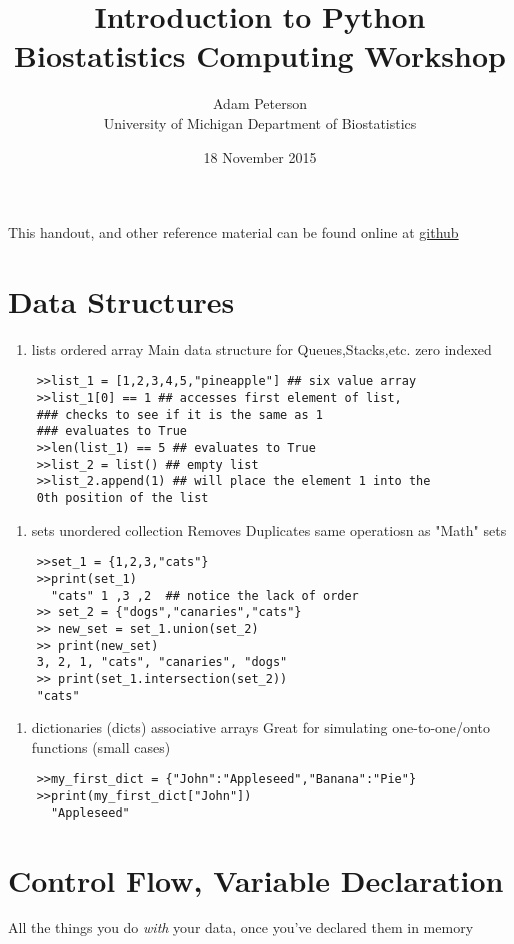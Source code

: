 \documentclass{article}
\title{Introduction to Python\\
	\Large{Biostatistics Computing Workshop}}
\author{Adam Peterson \\ \small{University of Michigan Department of Biostatistics}}
\date{18 November 2015}
\begin{document}
	\lstset{language=Python}
	\maketitle
	
	This handout, and other reference material can be found online at \href{https://github.com/apeterson91/computing_workshops}{github}

	\section{Data Structures}
			\begin{enumerate}
				\item lists
					\subitem ordered array
					\subitem Main data structure for Queues,Stacks,etc.
					\subitem zero indexed
			\end{enumerate}
	\begin{lstlisting}
	>>list_1 = [1,2,3,4,5,"pineapple"] ## six value array
	>>list_1[0] == 1 ## accesses first element of list, 
	### checks to see if it is the same as 1
	### evaluates to True
	>>len(list_1) == 5 ## evaluates to True
	>>list_2 = list() ## empty list
	>>list_2.append(1) ## will place the element 1 into the
	0th position of the list
	\end{lstlisting}
			\begin{enumerate}
				\item sets
					\subitem unordered collection
					\subitem Removes Duplicates
					\subitem same operatiosn as "Math" sets
			\end{enumerate}
	\begin{lstlisting}
	>>set_1 = {1,2,3,"cats"}
	>>print(set_1) 
	  "cats" 1 ,3 ,2  ## notice the lack of order
	>> set_2 = {"dogs","canaries","cats"}
	>> new_set = set_1.union(set_2)
	>> print(new_set)
	3, 2, 1, "cats", "canaries", "dogs"
	>> print(set_1.intersection(set_2))
	"cats"
	\end{lstlisting}
			\begin{enumerate}
				\item dictionaries (dicts)
					\subitem associative arrays
					\subitem Great for simulating one-to-one/onto functions (small cases)
			\end{enumerate}
	\begin{lstlisting}
	>>my_first_dict = {"John":"Appleseed","Banana":"Pie"}
	>>print(my_first_dict["John"])
	  "Appleseed"
	\end{lstlisting}
	\section{Control Flow, Variable Declaration}
		All the things you do \textit{with} your data, once you've declared them in memory\\
\end{document}
